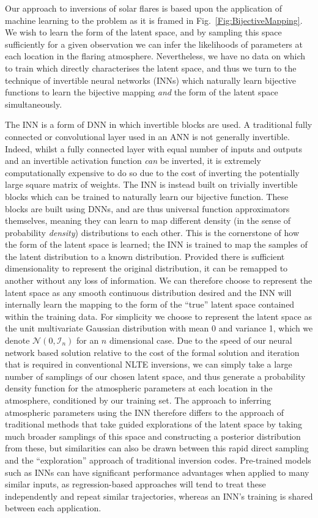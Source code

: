 Our approach to inversions of solar flares is based upon the application of machine learning to the problem as it is framed in Fig.~\ref{Fig:BijectiveMapping}.
We wish to learn the form of the latent space, and by sampling this space sufficiently for a given observation we can infer the likelihoods of parameters at each location in the flaring atmosphere.
Nevertheless, we have no data on which to train which directly characterises the latent space, and thus we turn to the technique of invertible neural networks (INNs) which naturally learn bijective functions to learn the bijective mapping \emph{and} the form of the latent space simultaneously.

The INN is a form of DNN in which invertible blocks are used.
A traditional fully connected or convolutional layer used in an ANN is not generally invertible.
Indeed, whilst a fully connected layer with equal number of inputs and outputs and an invertible activation function \emph{can} be inverted, it is extremely computationally expensive to do so due to the cost of inverting the potentially large square matrix of weights.
The INN is instead built on trivially invertible blocks which can be trained to naturally learn our bijective function.
These blocks are built using DNNs, and are thus universal function approximators themselves, meaning they can learn to map different density (in the sense of probability \emph{density}) distributions to each other.
This is the cornerstone of how the form of the latent space is learned; the INN is trained to map the samples of the latent distribution to a known distribution.
Provided there is sufficient dimensionality to represent the original distribution, it can be remapped to another without any loss of information.
We can therefore choose to represent the latent space as any smooth continuous distribution desired and the INN will internally learn the mapping to the form of the ``true'' latent space contained within the training data.
For simplicity we choose to represent the latent space as the unit multivariate Gaussian distribution with mean 0 and variance 1, which we denote $\mathcal{N}(0, \mathcal{I}_n)$ for an $n$ dimensional case.
Due to the speed of our neural network based solution relative to the cost of the formal solution and iteration that is required in conventional NLTE inversions, we can simply take a large number of samplings of our chosen latent space, and thus generate a probability density function for the atmospheric parameters at each location in the atmosphere, conditioned by our training set.
The approach to inferring atmospheric parameters using the INN therefore differs to the approach of traditional methods that take guided explorations of the latent space by taking much broader samplings of this space and constructing a posterior distribution from these, but similarities can also be drawn between this rapid direct sampling and the ``exploration'' approach of traditional inversion codes.
Pre-trained models such as INNs can have significant performance advantages when applied to many similar inputs, as regression-based approaches will tend to treat these independently and repeat similar trajectories, whereas an INN's training is shared between each application.

